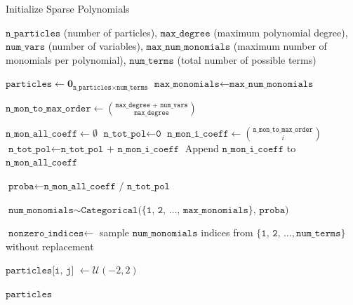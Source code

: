 \documentclass[11pt,a4paper]{article}
\begin{document}
\begin{algorithm}
	\caption{Initialize Sparse Polynomials}
	\label{alg:initialize-sparse}
	\begin{algorithmic}[1]
		\Require $\texttt{n\_particles}$ (number of particles), $\texttt{max\_degree}$ (maximum polynomial degree), $\texttt{num\_vars}$ (number of variables), $\texttt{max\_num\_monomials}$ (maximum number of monomials per polynomial), $\texttt{num\_terms}$ (total number of possible terms)
		
		\State $\texttt{particles} \leftarrow \mathbf{0}_{\texttt{n\_particles} \times \texttt{num\_terms}}$
		\State $\texttt{max\_monomials} \leftarrow \texttt{max\_num\_monomials}$
		
		\State $\texttt{n\_mon\_to\_max\_order} \leftarrow \binom{\texttt{max\_degree + num\_vars}}{\texttt{max\_degree}}$ 
		
		\State $\texttt{n\_mon\_all\_coeff} \leftarrow \emptyset$
		\State $\texttt{n\_tot\_pol} \leftarrow \texttt{0}$ 
		 
		\State $\texttt{n\_mon\_i\_coeff} \leftarrow \binom{\texttt{n\_mon\_to\_max\_order}}{i}$ 
		\State $\texttt{n\_tot\_pol} \leftarrow \texttt{n\_tot\_pol + n\_mon\_i\_coeff}$
		\State Append $\texttt{n\_mon\_i\_coeff}$ to $\texttt{n\_mon\_all\_coeff}$
		\EndFor
		
		\State $\texttt{proba} \leftarrow \texttt{n\_mon\_all\_coeff / n\_tot\_pol}$ 

		 

		\State $\texttt{num\_monomials} \sim \texttt{Categorical(\{1, 2, \ldots, max\_monomials\}, proba)}$ 
		
		\State $\texttt{nonzero\_indices}\leftarrow$ sample $\texttt{num\_monomials}$ indices from $\{\texttt{1, 2, }\ldots, \texttt{num\_terms}\}$ without replacement 
		
		 
		\State $\texttt{particles[i, j] }\leftarrow \mathcal{U}(-2,2)$ 
		\EndFor
		\EndFor
		
		\Return $\texttt{particles}$
	\end{algorithmic}
\end{algorithm}


\end{document}

